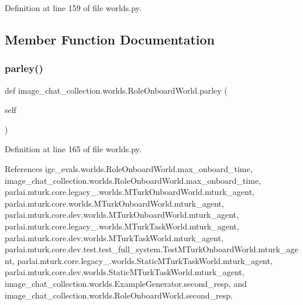 Definition at line 159 of file worlds.\+py.



\subsection{Member Function Documentation}
\mbox{\label{classimage__chat__collection_1_1worlds_1_1RoleOnboardWorld_a6ce045008b106b6a610770d18ea7c7da}} 
\subsubsection{\texorpdfstring{parley()}{parley()}}
{\footnotesize\ttfamily def image\+\_\+chat\+\_\+collection.\+worlds.\+Role\+Onboard\+World.\+parley (\begin{DoxyParamCaption}\item[{}]{self }\end{DoxyParamCaption})}



Definition at line 165 of file worlds.\+py.



References igc\+\_\+evals.\+worlds.\+Role\+Onboard\+World.\+max\+\_\+onboard\+\_\+time, image\+\_\+chat\+\_\+collection.\+worlds.\+Role\+Onboard\+World.\+max\+\_\+onboard\+\_\+time, parlai.\+mturk.\+core.\+legacy\+\_.\+worlds.\+M\+Turk\+Onboard\+World.\+mturk\+\_\+agent, parlai.\+mturk.\+core.\+worlds.\+M\+Turk\+Onboard\+World.\+mturk\+\_\+agent, parlai.\+mturk.\+core.\+dev.\+worlds.\+M\+Turk\+Onboard\+World.\+mturk\+\_\+agent, parlai.\+mturk.\+core.\+legacy\+\_.\+worlds.\+M\+Turk\+Task\+World.\+mturk\+\_\+agent, parlai.\+mturk.\+core.\+dev.\+worlds.\+M\+Turk\+Task\+World.\+mturk\+\_\+agent, parlai.\+mturk.\+core.\+dev.\+test.\+test\+\_\+full\+\_\+system.\+Test\+M\+Turk\+Onboard\+World.\+mturk\+\_\+agent, parlai.\+mturk.\+core.\+legacy\+\_.\+worlds.\+Static\+M\+Turk\+Task\+World.\+mturk\+\_\+agent, parlai.\+mturk.\+core.\+dev.\+worlds.\+Static\+M\+Turk\+Task\+World.\+mturk\+\_\+agent, image\+\_\+chat\+\_\+collection.\+worlds.\+Example\+Generator.\+second\+\_\+resp, and image\+\_\+chat\+\_\+collection.\+worlds.\+Role\+Onboard\+World.\+second\+\_\+resp.



